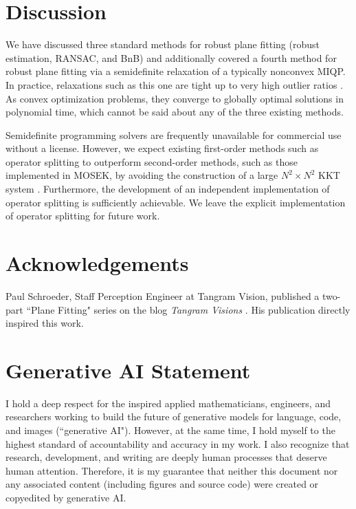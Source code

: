 \documentclass[conference]{IEEEtran}
\begin{document}
\section{Discussion}

We have discussed three standard methods for robust plane fitting (robust estimation, RANSAC, and BnB) and additionally covered a fourth method for robust plane fitting via a semidefinite relaxation of a typically nonconvex MIQP.  In practice, relaxations such as this one are tight up to very high outlier ratios \cite{quasar}.  As convex optimization problems, they converge to globally optimal solutions in polynomial time, which cannot be said about any of the three existing methods.

Semidefinite programming solvers are frequently unavailable for commercial use without a license.  However, we expect existing first-order methods such as operator splitting to outperform second-order methods, such as those implemented in MOSEK, by avoiding the construction of a large \( N^2 \times N^2 \) KKT system \cite{admm, mosek}.  Furthermore, the development of an independent implementation of operator splitting is sufficiently achievable.  We leave the explicit implementation of operator splitting for future work.

\section*{Acknowledgements}

Paul Schroeder, Staff Perception Engineer at Tangram Vision, published a two-part ``Plane Fitting" series on the blog \textit{Tangram Visions} \cite{gradients}.  His publication directly inspired this work.

\section*{Generative AI Statement}

I hold a deep respect for the inspired applied mathematicians, engineers, and researchers working to build the future of generative models for language, code, and images (``generative AI").  However, at the same time, I hold myself to the highest standard of accountability and accuracy in my work.  I also recognize that research, development, and writing are deeply human processes that deserve human attention.  Therefore, it is my guarantee that neither this document nor any associated content (including figures and source code) were created or copyedited by generative AI.
\end{document}
